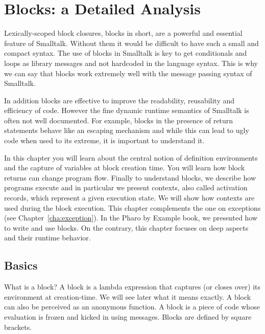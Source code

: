 \documentclass[a4paper,10pt,twoside]{book}
\begin{document}
\fi
\sloppy
\chapter{Blocks: a Detailed Analysis}

\indent

Lexically-scoped block closures, blocks in short, are a powerful and essential feature of Smalltalk. Without them it
would be difficult to have such a small and compact syntax. The use of blocks in Smalltalk
is key to get conditionals and loops as library messages and not hardcoded in the language syntax. This is why we can say that
blocks work extremely well with the message passing syntax of Smalltalk.

In addition blocks are  effective to improve the readability, reusability and efficiency of code. However the fine dynamic runtime semantics of Smalltalk is often not well documented. For example, blocks in the presence of return statements behave like an escaping mechanism and while this can lead to ugly code when used to its extreme, it is important to understand it. 

In this chapter you will learn about the central notion of definition environments  and the capture of variables at block creation time. You will learn how block returns can change program flow. Finally to understand blocks, we describe how programs execute and in particular we present contexts, also called activation records, which represent a given execution state. We will show how contexts are used during the block execution.
This chapter complements the one on exceptions (see Chapter~\ref{cha:exception}). In the Pharo by Example book, we presented how to write and use blocks. On the contrary, this chapter focuses on deep aspects and their runtime behavior.

\section{Basics}

What is a block? A block is a lambda expression that captures (or closes over) its environment at creation-time. We will see later what it means exactly. A block can also be perceived as an anonymous function. A block is a piece of code whose evaluation is frozen and kicked in using messages. Blocks are defined by square brackets.
\end{document}
